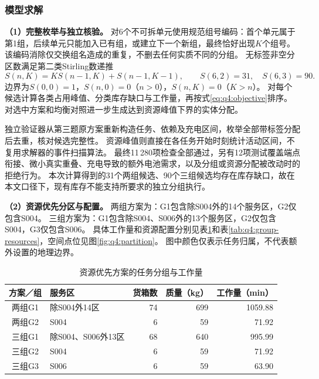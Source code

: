 \subsubsection{模型求解}
\label{sec:q4:solution}

\textbf{（1）完整枚举与独立核验。}
对6个不可拆单元使用规范组号编码：首个单元属于第1组，后续单元只能加入已有组，或建立下一个新组，最终恰好出现$K$个组号。
该编码消除仅交换组名造成的重复，不删去任何实质不同的分组。
无标签非空分区数满足第二类Stirling数递推
\begin{equation}
  S(n,K)=K S(n-1,K)+S(n-1,K-1),
  \qquad S(6,2)=31,\quad S(6,3)=90.
  \label{eq:q4:enumeration}
\end{equation}
边界为$S(0,0)=1$，$S(n,0)=0$（$n>0$），$S(n,K)=0$（$K>n$）。
对每个候选计算各类占用峰值、分类库存缺口与工作量，再按式\eqref{eq:q4:objective}排序。
对选中方案和均衡对照进一步生成达到资源峰值下界的实体分配。

独立验证器从第三题原方案重新构造任务、依赖及充电区间，枚举全部带标签分配后去重，核对候选完整性。
资源峰值则直接在各任务开始时刻统计活动区间，不复用求解器的事件扫描算法。
最终11\,280项检查全部通过，另有12项测试覆盖端点衔接、微小真实重叠、充电导致的额外电池需求，以及分组或资源分配被改动时的拒绝行为。
本次计算得到的31个两组候选、90个三组候选均存在库存缺口，故在本文口径下，现有库存不能支持所要求的独立分组执行。

\textbf{（2）资源优先分区与配置。}
两组方案为：G1包含除S004外的14个服务区，G2仅包含S004。
三组方案为：G1包含除S004、S006外的13个服务区，G2仅包含S004，G3仅包含S006。
具体工作量和资源配置分别见表\ref{tab:q4:group-work}和表\ref{tab:q4:group-resources}，空间点位见图\ref{fig:q4:partition}。
图中颜色仅表示任务归属，不代表额外设置的地理边界。

\begin{table}[htbp]
  \centering
  \caption{资源优先方案的任务分组与工作量}
  \label{tab:q4:group-work}
  \begin{tabular}{clrrr}
    \toprule
    方案／组 & 服务区 & 货箱数 & 质量（kg） & 工作量（min） \\
    \midrule
    两组G1 & 除S004外14区 & 74 & 699 & 1059.88 \\
    两组G2 & S004 & 6 & 59 & 71.92 \\
    \midrule
    三组G1 & 除S004、S006外13区 & 68 & 640 & 995.99 \\
    三组G2 & S004 & 6 & 59 & 71.92 \\
    三组G3 & S006 & 6 & 59 & 63.90 \\
    \bottomrule
  \end{tabular}
\end{table}

